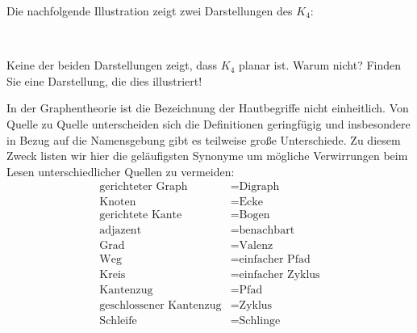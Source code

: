 \begin{bsp}
Die nachfolgende Illustration zeigt zwei Darstellungen des $K_4$:
\begin{center}
\hfill
{}
\hfill
{}
\hfill\,
\end{center}
Keine der beiden Darstellungen zeigt, dass $K_4$ planar ist.
Warum nicht?
Finden Sie eine Darstellung, die dies illustriert!
\end{bsp}



\begin{bem}
In der Graphentheorie ist die Bezeichnung der Hautbegriffe nicht einheitlich.
Von Quelle zu Quelle unterscheiden sich die Definitionen geringfügig und insbesondere in Bezug auf die Namensgebung gibt es teilweise große Unterschiede.
Zu diesem Zweck listen wir hier die geläufigsten Synonyme um mögliche Verwirrungen beim Lesen unterschiedlicher Quellen zu vermeiden:
\begin{align*}
\text{gerichteter Graph} &= \text{Digraph}\\
\text{Knoten} &= \text{Ecke}\\
\text{gerichtete Kante} &= \text{Bogen}\\
\text{adjazent} &= \text{benachbart}\\
\text{Grad} &= \text{Valenz}\\
\text{Weg} &= \text{einfacher Pfad}\\
\text{Kreis} &= \text{einfacher Zyklus}\\
\text{Kantenzug} &= \text{Pfad}\\
\text{geschlossener Kantenzug} &= \text{Zyklus}\\
\text{Schleife} &= \text{Schlinge}
\end{align*}
\end{bem}

